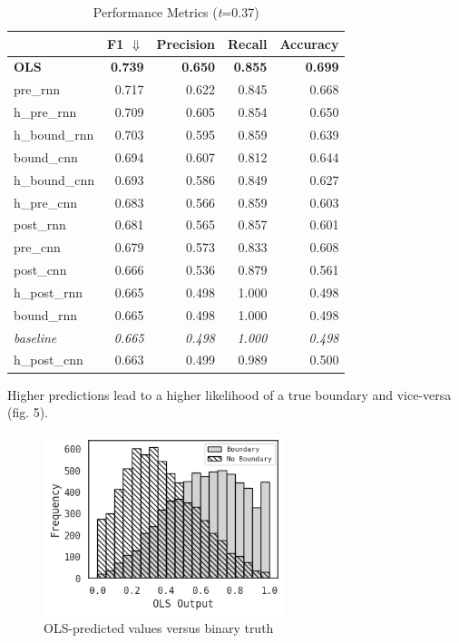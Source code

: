 \documentclass[conference]{IEEEtran}
\begin{document}
\begin{table}
\caption{Performance Metrics (\emph{t}=0.37)}
\smallskip
\begin{center}
\begin{tabular}{lrrrr}
\toprule
{} & F1 $\Downarrow$& Precision & Recall & Accuracy \\
\midrule
\bf{OLS} & \bf{0.739} & \bf{0.650} & \bf{0.855} & \bf{0.699} \\
pre\_rnn & 0.717 & 0.622 & 0.845 & 0.668 \\
h\_pre\_rnn & 0.709 & 0.605 & 0.854 & 0.650 \\
h\_bound\_rnn & 0.703 & 0.595 & 0.859 & 0.639 \\
bound\_cnn & 0.694 & 0.607 & 0.812 & 0.644 \\
h\_bound\_cnn & 0.693 & 0.586 & 0.849 & 0.627 \\
h\_pre\_cnn & 0.683 & 0.566 & 0.859 & 0.603 \\
post\_rnn & 0.681 & 0.565 & 0.857 & 0.601 \\
pre\_cnn & 0.679 & 0.573 & 0.833 & 0.608 \\
post\_cnn & 0.666 & 0.536 & 0.879 & 0.561 \\
h\_post\_rnn & 0.665 & 0.498 & 1.000 & 0.498 \\
bound\_rnn & 0.665 & 0.498 & 1.000 & 0.498 \\
\emph{baseline} & \emph{0.665} & \emph{0.498} & \emph{1.000} & \emph{0.498} \\
h\_post\_cnn & 0.663 & 0.499 & 0.989 & 0.500 \\
\bottomrule
\end{tabular}

\end{center}
\end{table}


Higher predictions lead to a higher likelihood of a true boundary and vice-versa (fig. 5).

\begin{figure}[htbp]
\centerline{\includegraphics[width=70mm]{boundary_hist.png}}
\caption{OLS-predicted values versus binary truth}
\label{fig}
\end{figure}
\end{document}
